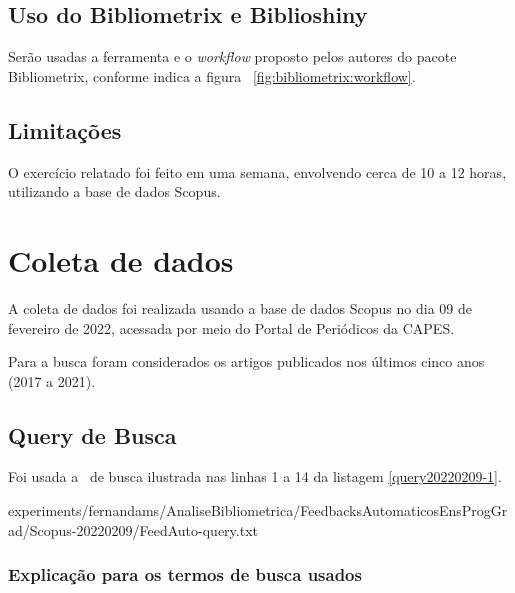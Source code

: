 
\subsection{Uso do Bibliometrix e Biblioshiny}
Serão usadas a ferramenta e o \textit{workflow} proposto pelos autores do pacote Bibliometrix, conforme indica a figura ~\ref{fig:bibliometrix:workflow}.

\subsection{Limitações} 

O exercício relatado foi feito em uma semana, envolvendo cerca de 10 a 12 horas, utilizando a base de dados Scopus.

\section{Coleta de dados \label{FeedAuto:coleta}}

A coleta de dados foi realizada usando a base de dados Scopus no dia 09 de fevereiro de 2022, acessada por meio do Portal de Periódicos da CAPES.

Para a busca foram considerados os artigos publicados nos últimos cinco anos (2017 a 2021).

\subsection{Query de Busca}

Foi usada a \query\  de busca ilustrada nas linhas 1 a 14 da listagem \ref{query20220209-1}.


{experiments/fernandams/AnaliseBibliometrica/FeedbacksAutomaticosEnsProgGrad/Scopus-20220209/FeedAuto-query.txt}

\subsubsection{Explicação para os termos de busca usados\label{FeedAuto:query}}


